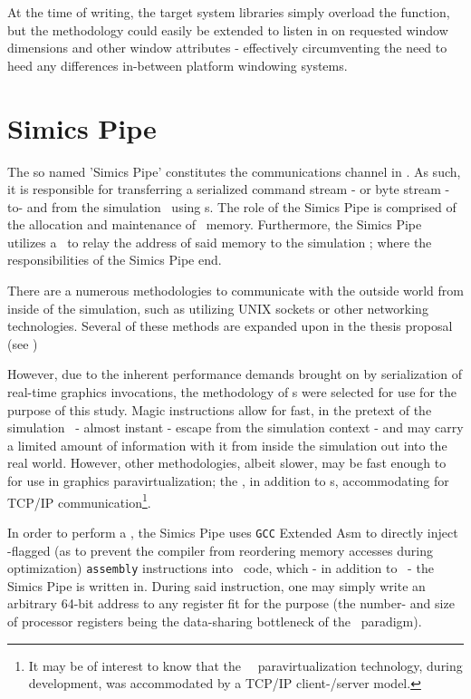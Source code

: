 At the time of writing, the target system libraries simply overload the  function, but the methodology could easily be extended to listen in on requested window dimensions and other window attributes - effectively circumventing the need to heed any differences in-between platform windowing systems.

\section{Simics Pipe}
\label{sec:methodologysolution_simicspipe}
The so named 'Simics Pipe' constitutes the communications channel in \dvttermsimics .
As such, it is responsible for transferring a serialized command stream - or byte stream - to- and from the simulation \dvttermhost\ using \dvttermmagicinstruction s.
The role of the Simics Pipe is comprised of the allocation and maintenance of  \dvttermtarget\ memory.
Furthermore, the Simics Pipe utilizes a \dvttermmagicinstruction\ to relay the address of said memory to the simulation \dvttermhost ; where the responsibilities of the Simics Pipe end.

There are a numerous methodologies to communicate with the outside world from inside of the simulation, such as utilizing UNIX sockets or other networking technologies.
Several of these methods are expanded upon in the thesis proposal (see )

However, due to the inherent performance demands brought on by serialization of real-time graphics invocations, the methodology of \dvttermmagicinstruction s were selected for use for the purpose of this study.
Magic instructions allow for fast, in the pretext of the simulation \dvttermtarget\ - almost instant - escape from the simulation context - and may carry a limited amount of information with it from inside the simulation out into the real world.
However, other methodologies, albeit slower, may be fast enough to for use in graphics paravirtualization; the \dvttermandroidemulator , in addition to \dvttermmagicinstruction s, accommodating for TCP/IP communication\footnote{It may be of interest to know that the \dvttermsimics\ \dvttermopengles\ paravirtualization technology, during development, was accommodated by a TCP/IP client-/server model.}.

In order to perform a \dvttermmagicinstruction , the Simics Pipe uses \texttt{GCC} Extended Asm to directly inject -flagged (as to prevent the compiler from reordering memory accesses during optimization) \texttt{assembly} instructions into \dvttermc\ code, which - in addition to \dvttermcplusplus\ - the Simics Pipe is written in.
During said instruction, one may simply write an arbitrary 64-bit address to any register fit for the purpose (the number- and size of processor registers being the data-sharing bottleneck of the \dvttermmagicinstruction\ paradigm).

